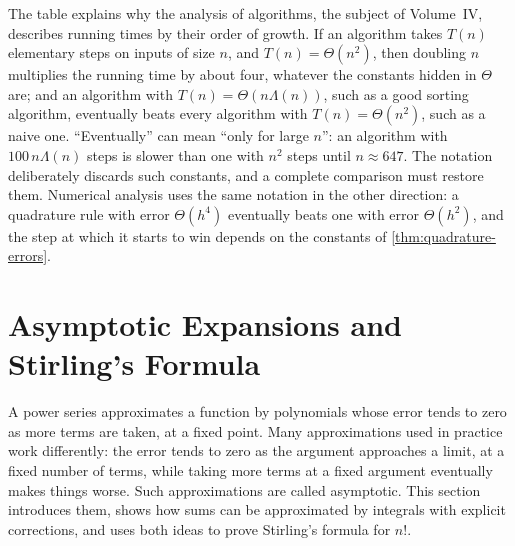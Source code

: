 \begin{table}
\end{table}

The table explains why the analysis of algorithms, the subject of Volume~IV, describes running times by their order of growth. If an algorithm takes $T(n)$ elementary steps on inputs of size $n$, and $T(n)=\Theta(n^2)$, then doubling $n$ multiplies the running time by about four, whatever the constants hidden in $\Theta$ are; and an algorithm with $T(n)=\Theta(n\Lambda(n))$, such as a good sorting algorithm, eventually beats every algorithm with $T(n)=\Theta(n^2)$, such as a naive one. ``Eventually'' can mean ``only for large $n$'': an algorithm with $100\,n\Lambda(n)$ steps is slower than one with $n^2$ steps until $n\approx647$. The notation deliberately discards such constants, and a complete comparison must restore them. Numerical analysis uses the same notation in the other direction: a quadrature rule with error $\Theta(h^4)$ eventually beats one with error $\Theta(h^2)$, and the step at which it starts to win depends on the constants of \cref{thm:quadrature-errors}.

\section{Asymptotic Expansions and Stirling's Formula}
\label{sec:asymptotic-expansions}

A power series approximates a function by polynomials whose error tends to zero as more terms are taken, at a fixed point. Many approximations used in practice work differently: the error tends to zero as the argument approaches a limit, at a fixed number of terms, while taking more terms at a fixed argument eventually makes things worse. Such approximations are called asymptotic. This section introduces them, shows how sums can be approximated by integrals with explicit corrections, and uses both ideas to prove Stirling's formula for $n!$.

